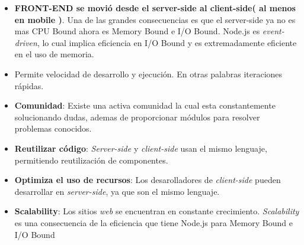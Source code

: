 \begin{itemize}
	\item \textbf{FRONT-END se movió desde el server-side al client-side( al menos en mobile )}. Una de las grandes consecuencias es que el server-side ya no es mas CPU Bound ahora es Memory Bound e I/O Bound. Node.js es \textit{event-driven}, lo cual implica eficiencia en I/O Bound y es extremadamente eficiente en el uso de memoria.
	\item Permite velocidad de desarrollo y ejecución. En otras palabras iteraciones rápidas.
	\item \textbf{Comunidad}: Existe una activa comunidad la cual esta constantemente solucionando dudas, ademas de proporcionar módulos para resolver problemas conocidos.
	\item \textbf{Reutilizar código}: \textit{Server-side} y \textit{client-side} usan el mismo lenguaje, permitiendo reutilización de componentes.
	\item \textbf{Optimiza el uso de recursos}: Los desarolladores de \textit{client-side} pueden desarrollar en \textit{server-side}, ya que son el mismo lenguaje.
	\item \textbf{Scalability}: Los sitios \textit{web} se encuentran en constante crecimiento. \textit{Scalability} es una consecuencia de la eficiencia que tiene Node.js para Memory Bound e I/O Bound
\end{itemize}

